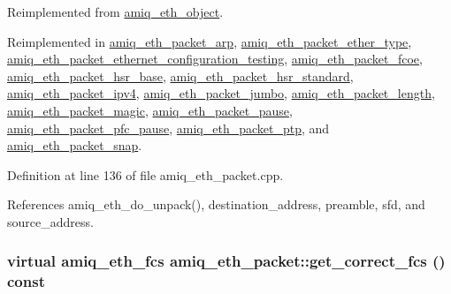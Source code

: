 Reimplemented from \hyperlink{classamiq__eth__object_aaa82659e656422df7dcf2cce578fc7d7}{amiq\_\-eth\_\-object}.

Reimplemented in \hyperlink{classamiq__eth__packet__arp_afa8463360e8e62b24e1171093b00a798}{amiq\_\-eth\_\-packet\_\-arp}, \hyperlink{classamiq__eth__packet__ether__type_a0c86ef80c46bbed384739b23e5efb0ef}{amiq\_\-eth\_\-packet\_\-ether\_\-type}, \hyperlink{classamiq__eth__packet__ethernet__configuration__testing_aff2640ccc3b20b80b16bb6ab20842f76}{amiq\_\-eth\_\-packet\_\-ethernet\_\-configuration\_\-testing}, \hyperlink{classamiq__eth__packet__fcoe_afb550561999badc5693283b852be2f70}{amiq\_\-eth\_\-packet\_\-fcoe}, \hyperlink{classamiq__eth__packet__hsr__base_ae61de71bd90f7a1c605e094845af5ccc}{amiq\_\-eth\_\-packet\_\-hsr\_\-base}, \hyperlink{classamiq__eth__packet__hsr__standard_aac95578ea89db3bd0ec190ca87e731c8}{amiq\_\-eth\_\-packet\_\-hsr\_\-standard}, \hyperlink{classamiq__eth__packet__ipv4_af85e08566b37953edee4566c40400f05}{amiq\_\-eth\_\-packet\_\-ipv4}, \hyperlink{classamiq__eth__packet__jumbo_a2d1f1c25847363d774336f8828384635}{amiq\_\-eth\_\-packet\_\-jumbo}, \hyperlink{classamiq__eth__packet__length_ab496b25828caaf23edd5fa6d4729c578}{amiq\_\-eth\_\-packet\_\-length}, \hyperlink{classamiq__eth__packet__magic_a400a90ae523af44eb0c38ba64ea6afe7}{amiq\_\-eth\_\-packet\_\-magic}, \hyperlink{classamiq__eth__packet__pause_aa458964a73aa61bca99cb30ffa56f54c}{amiq\_\-eth\_\-packet\_\-pause}, \hyperlink{classamiq__eth__packet__pfc__pause_abc86009030a38ab03469c697ffec73f6}{amiq\_\-eth\_\-packet\_\-pfc\_\-pause}, \hyperlink{classamiq__eth__packet__ptp_a831addd66dff7e42f2e2e9edb6f976b3}{amiq\_\-eth\_\-packet\_\-ptp}, and \hyperlink{classamiq__eth__packet__snap_a7bb9ce14ff76d5bacb715a53382a7816}{amiq\_\-eth\_\-packet\_\-snap}.

Definition at line 136 of file amiq\_\-eth\_\-packet.cpp.

References amiq\_\-eth\_\-do\_\-unpack(), destination\_\-address, preamble, sfd, and source\_\-address.\hypertarget{classamiq__eth__packet_a2f1fcef6ebdffa00a9b34fc7eae1be5e}{
\subsubsection[{get\_\-correct\_\-fcs}]{\setlength{\rightskip}{0pt plus 5cm}virtual {\bf amiq\_\-eth\_\-fcs} amiq\_\-eth\_\-packet::get\_\-correct\_\-fcs () const}}
\label{classamiq__eth__packet_a2f1fcef6ebdffa00a9b34fc7eae1be5e}


